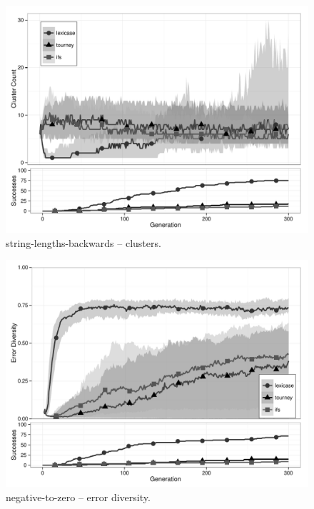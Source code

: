 \begin{figure}%
\centering
\includegraphics[width=11.5cm]{string-lengths-backwards-cluster.pdf}
\caption{string-lengths-backwards -- clusters.}
\label{string-lengths-backwardsClu}
\end{figure}

\begin{figure}%
\centering
\includegraphics[width=11.5cm]{negative-to-zero-diversity.pdf}
\caption{negative-to-zero -- error diversity.}
\label{negative-to-zeroDiv}
\end{figure}

